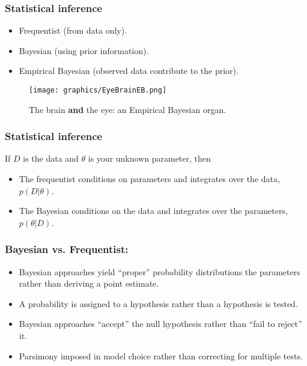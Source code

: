 \documentclass{beamer}
\newcommand{\1}{\ensuremath{\mathbf{1}}}
\begin{document}
%
%
%
\begin{frame}\frametitle{Statistical inference}
	\begin{itemize}
		\item Frequentist (from data only).
		\item Bayesian (using prior information).
		\item Empirical Bayesian (observed data contribute to the prior).
	\end{itemize}
	\begin{figure}
	\begin{center}
		\texttt{[image: graphics/EyeBrainEB.png]}
	\end{center}
	\caption{The brain \textbf{and} the eye: an Empirical Bayesian organ.}
	\end{figure}
\end{frame}
%
%
%
\begin{frame}\frametitle{Statistical inference}
	If $D$ is the data and $\theta$ is your unknown parameter, then
	\begin{itemize}
		\item The frequentist conditions on parameters and integrates over the data, $p(D|\theta)$.
		\item The Bayesian conditions on the data and integrates over the parameters, $p(\theta|D)$.
	\end{itemize}
\end{frame}
%
%
%
\begin{frame}\frametitle{Bayesian vs. Frequentist:}
	\begin{itemize}
		\item Bayesian approaches yield ``proper'' probability distributions the parameters rather than deriving a point estimate.
		\item A probability is assigned to a hypothesis rather than a hypothesis is tested.
		\item Bayesian approaches ``accept'' the null hypothesis rather than ``fail to reject'' it.
		\item Parsimony imposed in model choice rather than correcting for multiple tests.
	\end{itemize}
\end{frame}
\end{document}
